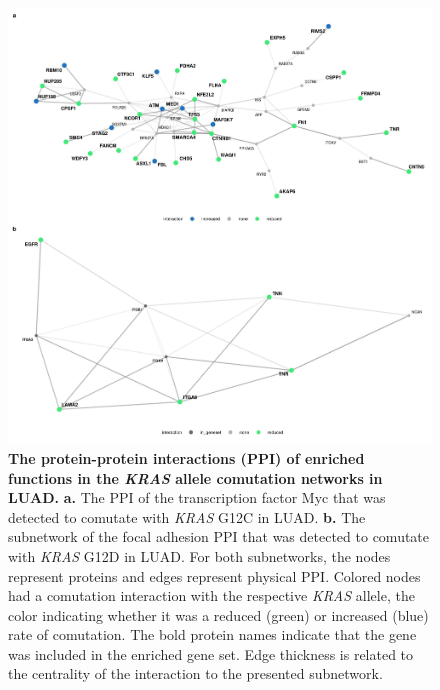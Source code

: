 \documentclass[english, 10pt, letterpaper]{article}
\newcommand{\KRAS}{\emph{KRAS}}
\begin{document}
\begin{figure}
\centering
\includegraphics[width=\textwidth]{figures/SuppFigure_11.jpeg}
\caption{
    \textbf{The protein-protein interactions (PPI) of enriched functions in the \KRAS{} allele comutation networks in LUAD.}
    \textbf{a.} The PPI of the transcription factor Myc that was detected to comutate with \KRAS{} G12C in LUAD.
    \textbf{b.} The subnetwork of the focal adhesion PPI that was detected to comutate with \KRAS{} G12D in LUAD.
    For both subnetworks, the nodes represent proteins and edges represent physical PPI. Colored nodes had a comutation interaction with the respective \KRAS{} allele, the color indicating whether it was a reduced (green) or increased (blue) rate of comutation.
    The bold protein names indicate that the gene was included in the enriched gene set.
    Edge thickness is related to the centrality of the interaction to the presented subnetwork.
}
\label{sfig:luad-enriched-comutation-ppi-examples}
\end{figure}
\end{document}
